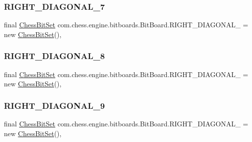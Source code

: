 \subsubsection{\texorpdfstring{RIGHT\_DIAGONAL\_7}{RIGHT\_DIAGONAL\_7}}
{\footnotesize\ttfamily final \mbox{\hyperlink{classcom_1_1chess_1_1engine_1_1bitboards_1_1_chess_bit_set}{Chess\+Bit\+Set}} com.\+chess.\+engine.\+bitboards.\+Bit\+Board.\+R\+I\+G\+H\+T\+\_\+\+D\+I\+A\+G\+O\+N\+A\+L\+\_ = new \mbox{\hyperlink{classcom_1_1chess_1_1engine_1_1bitboards_1_1_chess_bit_set}{Chess\+Bit\+Set}}()\hspace{0.3cm}{\ttfamily [static]}, {\ttfamily [private]}}

\mbox{\label{classcom_1_1chess_1_1engine_1_1bitboards_1_1_bit_board_ab5154add7b7a0c32b319e44136c5beef}} 
\subsubsection{\texorpdfstring{RIGHT\_DIAGONAL\_8}{RIGHT\_DIAGONAL\_8}}
{\footnotesize\ttfamily final \mbox{\hyperlink{classcom_1_1chess_1_1engine_1_1bitboards_1_1_chess_bit_set}{Chess\+Bit\+Set}} com.\+chess.\+engine.\+bitboards.\+Bit\+Board.\+R\+I\+G\+H\+T\+\_\+\+D\+I\+A\+G\+O\+N\+A\+L\+\_ = new \mbox{\hyperlink{classcom_1_1chess_1_1engine_1_1bitboards_1_1_chess_bit_set}{Chess\+Bit\+Set}}()\hspace{0.3cm}{\ttfamily [static]}, {\ttfamily [private]}}

\mbox{\label{classcom_1_1chess_1_1engine_1_1bitboards_1_1_bit_board_ae4884846ea992f2c2ad036d49d6be6e8}} 
\subsubsection{\texorpdfstring{RIGHT\_DIAGONAL\_9}{RIGHT\_DIAGONAL\_9}}
{\footnotesize\ttfamily final \mbox{\hyperlink{classcom_1_1chess_1_1engine_1_1bitboards_1_1_chess_bit_set}{Chess\+Bit\+Set}} com.\+chess.\+engine.\+bitboards.\+Bit\+Board.\+R\+I\+G\+H\+T\+\_\+\+D\+I\+A\+G\+O\+N\+A\+L\+\_ = new \mbox{\hyperlink{classcom_1_1chess_1_1engine_1_1bitboards_1_1_chess_bit_set}{Chess\+Bit\+Set}}()\hspace{0.3cm}{\ttfamily [static]}, {\ttfamily [private]}}

